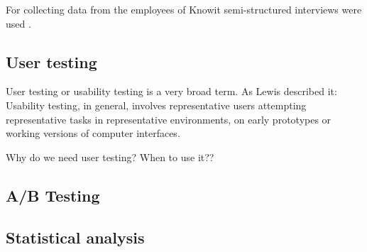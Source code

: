 For collecting data from the employees of Knowit semi-structured interviews were used \cite{galletta2013mastering}. 


\subsection{User testing}%
\label{sub:User testing}
User testing or usability testing is a very broad term. As Lewis \cite{lewis2006usability} described it: Usability testing, in general, involves representative users attempting representative tasks in representative environments, on early prototypes or working versions of computer interfaces.

Why do we need user testing?
When to use it??




\cite{nielsen1994estimating} 

\cite{nielsen1994heuristic} 


\subsection{A/B Testing}%
\label{sub:A/B Testing}


\subsection{Statistical analysis}%
\label{sub:Statistical analysis}

